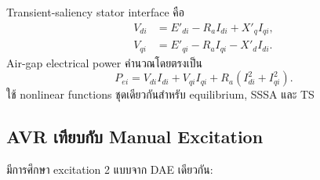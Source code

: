 \documentclass[12pt,a4paper]{article}
\begin{document}
Transient-saliency stator interface คือ
\begin{align}
V_{di}&=E'_{di}-R_aI_{di}+X'_qI_{qi},\\
V_{qi}&=E'_{qi}-R_aI_{qi}-X'_dI_{di}.
\end{align}
Air-gap electrical power คำนวณโดยตรงเป็น
\begin{equation}
P_{ei}=V_{di}I_{di}+V_{qi}I_{qi}+R_a(I_{di}^2+I_{qi}^2).
\end{equation}
ใช้ nonlinear functions ชุดเดียวกันสำหรับ equilibrium, SSSA และ TS

\subsection{AVR เทียบกับ Manual Excitation}

มีการศึกษา excitation 2 แบบจาก DAE เดียวกัน:
\end{document}
